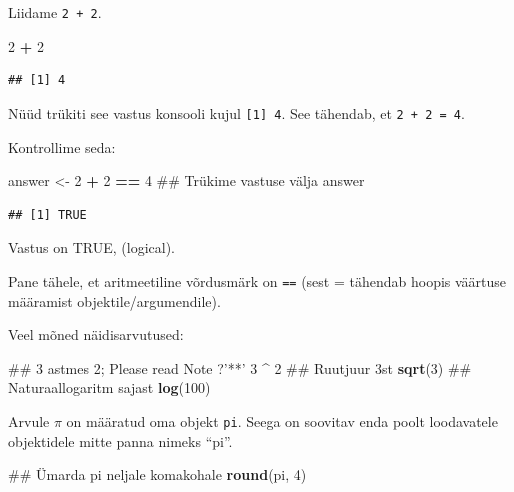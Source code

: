\documentclass[]{book}
\newenvironment{Shaded}{\begin{snugshade}}{\end{snugshade}}
\newcommand{\KeywordTok}[1]{\textcolor[rgb]{0.13,0.29,0.53}{\textbf{#1}}}
\newcommand{\DecValTok}[1]{\textcolor[rgb]{0.00,0.00,0.81}{#1}}
\newcommand{\StringTok}[1]{\textcolor[rgb]{0.31,0.60,0.02}{#1}}
\newcommand{\OperatorTok}[1]{\textcolor[rgb]{0.81,0.36,0.00}{\textbf{#1}}}
\newcommand{\NormalTok}[1]{#1}
\begin{document}
Liidame \texttt{2\ +\ 2}.

\begin{Shaded}
\begin{Highlighting}[]
\DecValTok{2} \OperatorTok{+}\StringTok{ }\DecValTok{2}
\end{Highlighting}
\end{Shaded}

\begin{verbatim}
## [1] 4
\end{verbatim}

Nüüd trükiti see vastus konsooli kujul \texttt{{[}1{]}\ 4}. See
tähendab, et \texttt{2\ +\ 2\ =\ 4}.

Kontrollime seda:

\begin{Shaded}
\begin{Highlighting}[]
\NormalTok{answer <-}\StringTok{ }\DecValTok{2} \OperatorTok{+}\StringTok{ }\DecValTok{2} \OperatorTok{==}\StringTok{ }\DecValTok{4}
\NormalTok{## Trükime vastuse välja}
\NormalTok{answer}
\end{Highlighting}
\end{Shaded}

\begin{verbatim}
## [1] TRUE
\end{verbatim}

Vastus on TRUE, (logical).

Pane tähele, et aritmeetiline võrdusmärk on \texttt{==} (sest = tähendab
hoopis väärtuse määramist objektile/argumendile).

Veel mõned näidisarvutused:

\begin{Shaded}
\begin{Highlighting}[]
\NormalTok{## 3 astmes 2; Please read Note ?'**' }
\DecValTok{3} \OperatorTok{^}\StringTok{ }\DecValTok{2}
\NormalTok{## Ruutjuur 3st}
\KeywordTok{sqrt}\NormalTok{(}\DecValTok{3}\NormalTok{)}
\NormalTok{## Naturaallogaritm sajast}
\KeywordTok{log}\NormalTok{(}\DecValTok{100}\NormalTok{)}
\end{Highlighting}
\end{Shaded}

Arvule \(\pi\) on määratud oma objekt \texttt{pi}. Seega on soovitav
enda poolt loodavatele objektidele mitte panna nimeks ``pi''.

\begin{Shaded}
\begin{Highlighting}[]
\NormalTok{## Ümarda pi neljale komakohale}
\KeywordTok{round}\NormalTok{(pi, }\DecValTok{4}\NormalTok{)}
\end{Highlighting}
\end{Shaded}
\end{document}
